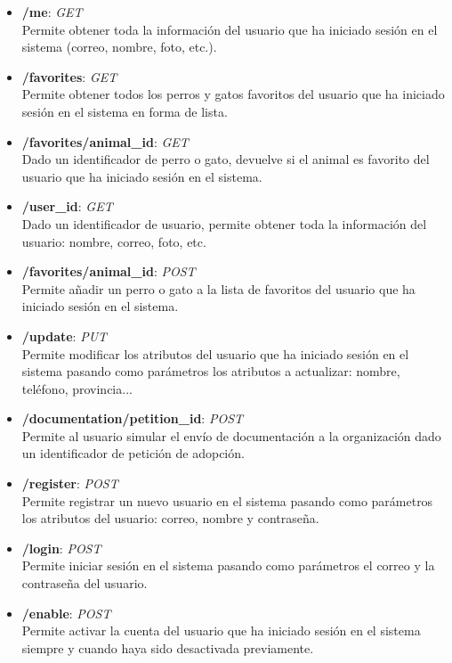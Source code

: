\begin{itemize}
    \item \textbf{/me}: \textit{GET} \\
    Permite obtener toda la información del usuario que ha iniciado sesión en el sistema (correo, nombre, foto, etc.).
    \item \textbf{/favorites}: \textit{GET} \\
    Permite obtener todos los perros y gatos favoritos del usuario que ha iniciado sesión en el sistema en forma de lista.
    \item \textbf{/favorites/{animal\_id}}: \textit{GET} \\
    Dado un identificador de perro o gato, devuelve si el animal es favorito del usuario que ha iniciado sesión en el sistema.
    \item \textbf{/{user\_id}}: \textit{GET} \\
    Dado un identificador de usuario, permite obtener toda la información del usuario: nombre, correo, foto, etc.
    \item \textbf{/favorites/{animal\_id}}: \textit{POST} \\
    Permite añadir un perro o gato a la lista de favoritos del usuario que ha iniciado sesión en el sistema.
    \item \textbf{/update}: \textit{PUT} \\
    Permite modificar los atributos del usuario que ha iniciado sesión en el sistema pasando como parámetros los atributos a actualizar: nombre, teléfono, provincia...
    \item \textbf{/documentation/{petition\_id}}: \textit{POST} \\
    Permite al usuario simular el envío de documentación a la organización dado un identificador de petición de adopción.
    \item \textbf{/register}: \textit{POST} \\
    Permite registrar un nuevo usuario en el sistema pasando como parámetros los atributos del usuario: correo, nombre y contraseña.
    \item \textbf{/login}: \textit{POST} \\
    Permite iniciar sesión en el sistema pasando como parámetros el correo y la contraseña del usuario.
    \item \textbf{/enable}: \textit{POST} \\
    Permite activar la cuenta del usuario que ha iniciado sesión en el sistema siempre y cuando haya sido desactivada previamente.

\end{itemize}
